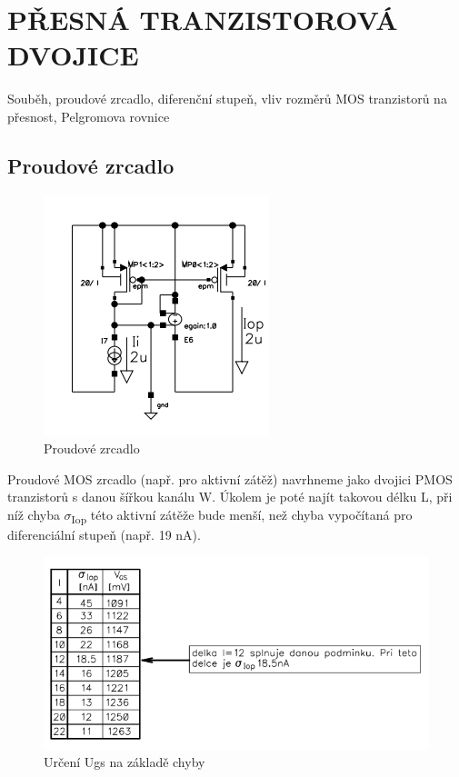 \section{PŘESNÁ TRANZISTOROVÁ DVOJICE}
Souběh, proudové zrcadlo, diferenční stupeň, vliv rozměrů MOS tranzistorů na přesnost, Pelgromova rovnice

\subsection{Proudové zrcadlo}
\begin{figure}[h]
   \begin{center}
     \includegraphics[scale=0.6]{images/MOS1.png}
   \end{center}
   \caption{Proudové zrcadlo}
\end{figure}

Proudové MOS zrcadlo (např. pro aktivní zátěž) navrhneme jako dvojici PMOS tranzistorů s danou šířkou kanálu W. Úkolem je poté najít takovou délku L, při níž chyba $\sigma$\textsubscript{Iop} této aktivní zátěže bude menší, než chyba vypočítaná pro diferenciální stupeň (např. 19 nA).

\begin{figure}[h]
   \begin{center}
     \includegraphics[scale=0.6]{images/Urceni.png}
   \end{center}
   \caption{Určení Ugs na základě chyby}
\end{figure}


